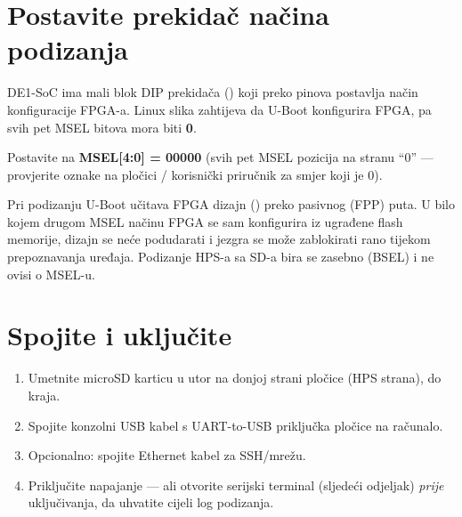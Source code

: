 \section{Postavite prekidač načina podizanja}
DE1-SoC ima mali blok DIP prekidača () koji preko 
pinova postavlja način konfiguracije FPGA-a. Linux slika zahtijeva da U-Boot
konfigurira FPGA, pa svih pet MSEL bitova mora biti \textbf{0}.
\begin{warn}
Postavite  na \textbf{MSEL[4:0] = 00000} (svih pet MSEL pozicija na
stranu ``0'' --- provjerite oznake na pločici / korisnički priručnik za smjer koji je 0).
\end{warn}
Pri podizanju U-Boot učitava FPGA dizajn () preko pasivnog
(FPP) puta. U bilo kojem drugom MSEL načinu FPGA se sam konfigurira iz ugrađene
flash memorije, dizajn se neće podudarati i jezgra se može zablokirati rano tijekom
prepoznavanja uređaja. Podizanje HPS-a sa SD-a bira se zasebno (BSEL) i ne ovisi o MSEL-u.

\section{Spojite i uključite}
\begin{enumerate}
  \item Umetnite microSD karticu u utor na donjoj strani pločice (HPS strana), do kraja.
  \item Spojite konzolni USB kabel s UART-to-USB priključka pločice na računalo.
  \item Opcionalno: spojite Ethernet kabel za SSH/mrežu.
  \item Priključite napajanje --- ali otvorite serijski terminal (sljedeći odjeljak) \emph{prije} uključivanja, da uhvatite cijeli log podizanja.
\end{enumerate}

